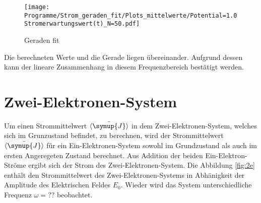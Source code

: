\begin{figure}
    \centering
    \texttt{[image: Programme/Strom\_geraden\_fit/Plots\_mittelwerte/Potential=1.0Stromerwartungswert(t)\_N=50.pdf]}
    \caption{Geraden fit}
    \label{fig:geraden_fit}
\end{figure}

Die berechneten Werte und die Gerade liegen übereinander.
Aufgrund dessen kann der lineare Zusammenhang in diesem Frequenzbereich bestätigt werden.


\section{Zwei-Elektronen-System}
Um einen Strommittelwert $\bar{\braket{\symup{J}}}$
in dem Zwei-Elektronen-System,
welches sich im Grunzustand befindet, zu berechnen,
wird der Strommittelwert $\bar{\braket{\symup{J}}}$
für ein Ein-Elektronen-System
sowohl im Grundzustand als
auch im ersten Angeregeten Zustand
berechnet. Aus Addition der beiden
Ein-Elektron-Ströme ergibt sich der Strom
des Zwei-Elektronen-System.
Die Abbildung \ref{fig:2e} enthält
den Strommittelwert des Zwei-Elektronen-Systems
in Abhänigkeit der Amplitude
des Elektrischen Feldes $E_0$.
Wieder wird das System
unterschiedliche Frequenz $\omega=??$
beobachtet.

